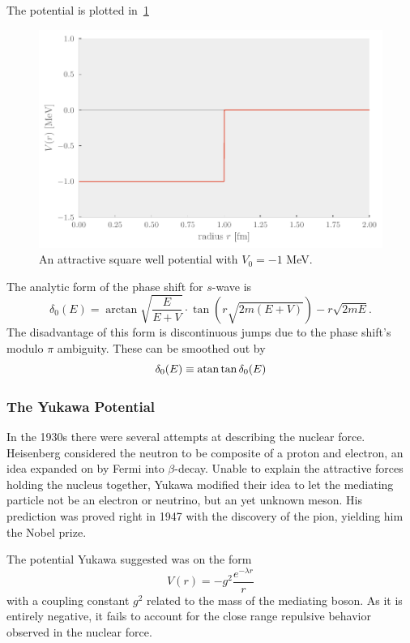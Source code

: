 The potential is plotted in~\cref{fig:squarewell}

\begin{figure}[H]
  \centering
  \includegraphics[]{Figures/squarewell.pdf}
  \caption{\label{fig:squarewell} An attractive square well potential with
    \(V_{0}=-1\) MeV.}
\end{figure}

The analytic form of the phase shift for \(s\)-wave is\cite{morten}
\begin{equation*}
  \delta_{0}(E) = \arctan\sqrt{\frac{E}{E+V}} \cdot \tan\left( r\sqrt{2m(E+V)} \right) - r\sqrt{2mE}.
\end{equation*}
The disadvantage of this form is discontinuous jumps due to the phase shift's
modulo \(\pi\) ambiguity. These can be smoothed out by
\begin{equation*}
  \delta_{0}(E) \equiv \atan\tan\delta_{0}(E)
\end{equation*}


\subsubsection{The Yukawa Potential}
In the 1930s there were several attempts at describing the nuclear force.
Heisenberg considered the neutron to be composite of a proton and electron,
an idea expanded on by Fermi into \(\beta\)-decay. Unable to explain the
attractive forces holding the nucleus together, Yukawa modified their idea to
let the mediating particle not be an electron or neutrino, but an yet unknown
meson\cite{yukawa}. His prediction was proved right in 1947 with the discovery
of the pion, yielding him the Nobel prize.

The potential Yukawa suggested was on the form
\begin{equation*}
  V(r) = -g^{2}\frac{e^{-\lambda r}}{r}
\end{equation*}
with a coupling constant \(g^{2}\) related to the mass of the mediating boson.
As it is entirely negative, it fails to account for the close range repulsive
behavior observed in the nuclear force.


